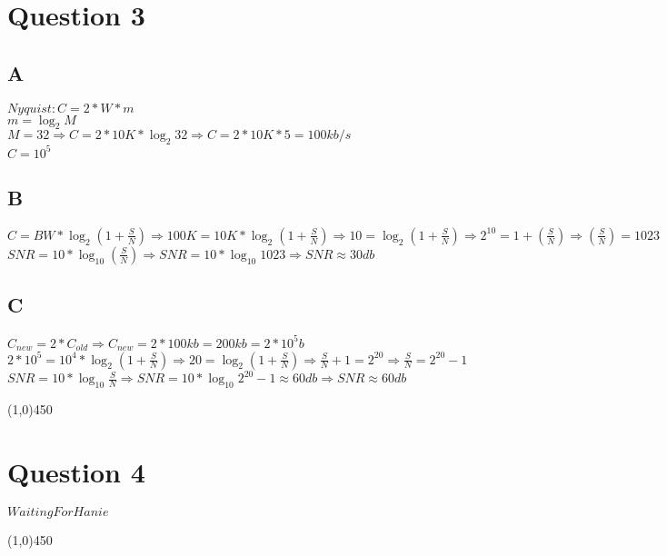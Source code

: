 \documentclass[a4paper,12pt]{book}
\begin{document}
\section {Question 3 }

\subsection{A}
\begin{doublespace}
$Nyquist : C = 2 * W * m $ \\
$m = \log_2 {M}$\\
$M = 32 \Longrightarrow C = 2 * 10 K * \log_{2} {32}  \Longrightarrow C = 2 * 10K * 5 = 100 kb/s$\\
$C = 10^5$
\end{doublespace}



\subsection{B}
\begin{doublespace}
$C = BW * \log_2 {(1 + \frac{S}{N} )}  \Longrightarrow 100K = 10K * \log_2 {(1 + \frac{S}{N}) }  \Longrightarrow 10 = \log_2 {(1 + \frac{S}{N}) } \Longrightarrow 2^{10} = 1 + (\frac{S}{N}) \Longrightarrow (\frac{S}{N}) = 1023 $\\
$SNR = 10 * \log_{10} (\frac {S}{N}) \Longrightarrow SNR = 10 * \log_{10}{1023} \Longrightarrow SNR \approx 30 db$
\end{doublespace}


\subsection{C}
\begin{doublespace}
$C_{new} = 2 * C_{old} \Longrightarrow C_{new} = 2 * 100kb = 200kb = 2 * 10^5 b$\\
$2 * 10^5 = 10^4 * \log_2 {(1 + \frac{S}{N} ) } \Longrightarrow 20 = \log_2 {(1 + \frac{S}{N} )} \Longrightarrow \frac{S}{N} + 1 = 2 ^{20} \Longrightarrow \frac{S}{N} = 2^{20} - 1 $\\
$SNR = 10 * \log_{10}{\frac{S}{N}} \Longrightarrow SNR = 10 * \log_{10}{2^{20} - 1 } \approx 60 db  \Longrightarrow SNR \approx 60 db$

\end{doublespace}
\line(1,0){450}

\section {Question 4 }
\begin{doublespace}
$Waiting For Hanie$
\end{doublespace}
\line(1,0){450}
\end{document}
